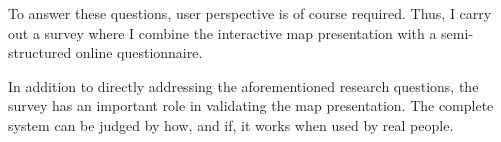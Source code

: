 To answer these questions, user perspective is of course required.
Thus, I carry out a survey
where I combine the interactive map presentation with
a semi-structured online questionnaire.

In addition to directly addressing the aforementioned research questions,
the survey has an important role in validating the map presentation.
The complete system can be judged by
how, and if, it works when used by real people.










